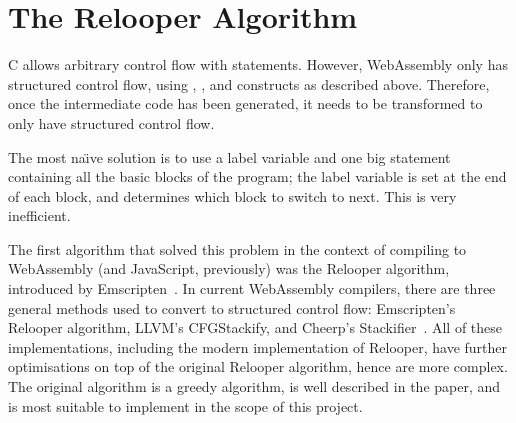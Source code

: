 \documentclass[00-main.tex]{subfiles}
\begin{document}




\section{The Relooper Algorithm}\label{sec:prep:relooper}

C allows arbitrary control flow with  statements.
However, WebAssembly only has structured control flow, using , , and  constructs as described above.
Therefore, once the intermediate code has been generated, it needs to be transformed to only have structured control flow.

The most na\"{\i}ve solution is to use a label variable and one big  statement containing all the basic blocks of the program; the label variable is set at the end of each block, and determines which block to switch to next.
This is very inefficient.

The first algorithm that solved this problem in the context of compiling to WebAssembly (and JavaScript, previously) was the Relooper algorithm, introduced by Emscripten~.
In current Web\-Assembly compilers, there are three general methods used to convert to structured control flow: Emscripten's Relooper algorithm, LLVM's CFGStackify, and Cheerp's Stackifier~.
All of these implementations, including the modern implementation of Relooper, have further optimisations on top of the original Relooper algorithm, hence are more complex.
The original algorithm is a greedy algorithm, is well described in the paper, and is most suitable to implement in the scope of this project.
\end{document}
